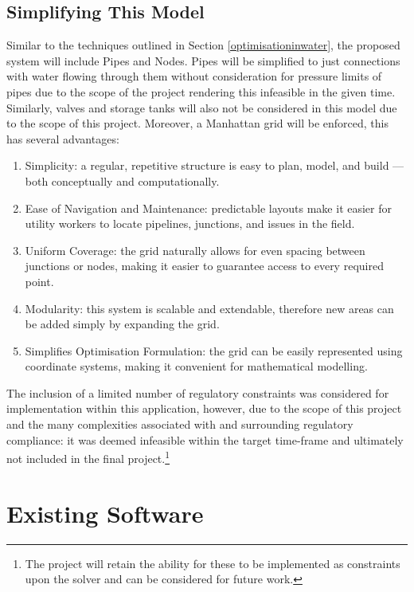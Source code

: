 \subsection{Simplifying This Model}
Similar to the techniques outlined in Section \ref{optimisationinwater}, the proposed system will include Pipes and Nodes. Pipes will be simplified to just connections with water flowing through them without consideration for pressure limits of pipes due to the scope of the project rendering this infeasible in the given time. Similarly, valves and storage tanks will also not be considered in this model due to the scope of this project.\newline
Moreover, a Manhattan grid will be enforced, this has several advantages:
\begin{enumerate}
    \item Simplicity: a regular, repetitive structure is easy to plan, model, and build — both conceptually and computationally.
    \item Ease of Navigation and Maintenance: predictable layouts make it easier for utility workers to locate pipelines, junctions, and issues in the field.
    \item Uniform Coverage: the grid naturally allows for even spacing between junctions or nodes, making it easier to guarantee access to every required point.
    \item Modularity: this system is scalable and extendable, therefore new areas can be added simply by expanding the grid.
    \item Simplifies Optimisation Formulation: the grid can be easily represented using coordinate systems, making it convenient for mathematical modelling.
\end{enumerate}
The inclusion of a limited number of regulatory constraints was considered for implementation within this application, however, due to the scope of this project and the many complexities associated with and surrounding regulatory compliance: it was deemed infeasible within the target time-frame and ultimately not included in the final project.\footnote{The project will retain the ability for these to be implemented as constraints upon the solver and can be considered for future work.}

\section{Existing Software} 
\label{section1.1}

